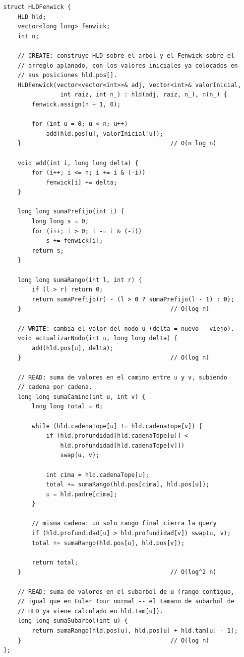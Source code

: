 \documentclass[10pt,a4paper,twocolumn]{article}
\begin{document}
\begin{lstlisting}[style=cpp]
struct HLDFenwick {
    HLD hld;
    vector<long long> fenwick;
    int n;

    // CREATE: construye HLD sobre el arbol y el Fenwick sobre el
    // arreglo aplanado, con los valores iniciales ya colocados en
    // sus posiciones hld.pos[].
    HLDFenwick(vector<vector<int>>& adj, vector<int>& valorInicial,
                int raiz, int n_) : hld(adj, raiz, n_), n(n_) {
        fenwick.assign(n + 1, 0);

        for (int u = 0; u < n; u++)
            add(hld.pos[u], valorInicial[u]);
    }                                          // O(n log n)

    void add(int i, long long delta) {
        for (i++; i <= n; i += i & (-i))
            fenwick[i] += delta;
    }

    long long sumaPrefijo(int i) {
        long long s = 0;
        for (i++; i > 0; i -= i & (-i))
            s += fenwick[i];
        return s;
    }

    long long sumaRango(int l, int r) {
        if (l > r) return 0;
        return sumaPrefijo(r) - (l > 0 ? sumaPrefijo(l - 1) : 0);
    }                                          // O(log n)

    // WRITE: cambia el valor del nodo u (delta = nuevo - viejo).
    void actualizarNodo(int u, long long delta) {
        add(hld.pos[u], delta);
    }                                          // O(log n)

    // READ: suma de valores en el camino entre u y v, subiendo
    // cadena por cadena.
    long long sumaCamino(int u, int v) {
        long long total = 0;

        while (hld.cadenaTope[u] != hld.cadenaTope[v]) {
            if (hld.profundidad[hld.cadenaTope[u]] <
                hld.profundidad[hld.cadenaTope[v]])
                swap(u, v);

            int cima = hld.cadenaTope[u];
            total += sumaRango(hld.pos[cima], hld.pos[u]);
            u = hld.padre[cima];
        }

        // misma cadena: un solo rango final cierra la query
        if (hld.profundidad[u] > hld.profundidad[v]) swap(u, v);
        total += sumaRango(hld.pos[u], hld.pos[v]);

        return total;
    }                                          // O(log^2 n)

    // READ: suma de valores en el subarbol de u (rango contiguo,
    // igual que en Euler Tour normal -- el tamano de subarbol de
    // HLD ya viene calculado en hld.tam[u]).
    long long sumaSubarbol(int u) {
        return sumaRango(hld.pos[u], hld.pos[u] + hld.tam[u] - 1);
    }                                          // O(log n)
};
\end{lstlisting}
\end{document}
